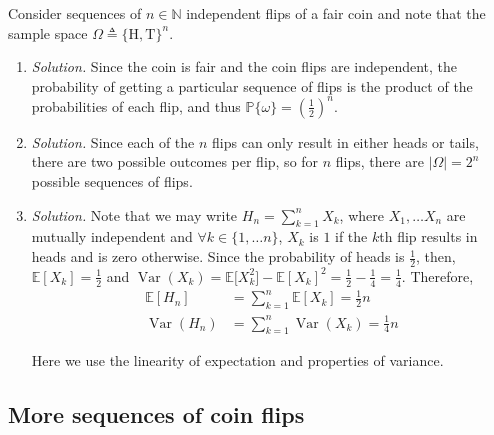 \documentclass{article}
\numberwithin{equation}{section}
\begin{document}
Consider sequences of $ n \in \mathbb{N} $ independent flips of a fair coin
and note that the sample space $ \Omega \triangleq \{\text{H}, \text{T}\}^n $.
\begin{enumerate}[label = \alph*.]
    \item
    \textit{Solution.} Since the coin is fair and the coin flips are
    independent, the probability of getting a particular sequence of flips is
    the product of the probabilities of each flip, and thus
    $ \mathbb{P}\{\omega\} = \left(\frac{1}{2}\right)^n $.

    \item
    \textit{Solution.} Since each of the $ n $ flips can only result in either
    heads or tails, there are two possible outcomes per flip, so for $ n $
    flips, there are $ |\Omega| = 2^n $ possible sequences of flips.

    \item
    \textit{Solution.} Note that we may write $ H_n = \sum_{k = 1}^nX_k $,
    where $ X_1, \ldots X_n $ are mutually independent and
    $ \forall k \in \{1, \ldots n\} $, $ X_k $ is $ 1 $ if the $ k $th flip
    results in heads and is zero otherwise. Since the probability of heads is
    $ \frac{1}{2} $, then, $ \mathbb{E}[X_k] = \frac{1}{2} $ and
    $ \operatorname{Var}(X_k) = \mathbb{E}\big[X_k^2\big] - \mathbb{E}[X_k]^2 = \frac{1}{2} - \frac{1}{4} = \frac{1}{4} $. Therefore,
    \begin{equation*}
        \begin{split}
        \mathbb{E}[H_n] & = \sum_{k = 1}^n\mathbb{E}[X_k] = \frac{1}{2}n \\
        \operatorname{Var}(H_n) & = \sum_{k = 1}^n\operatorname{Var}(X_k) =
            \frac{1}{4}n
        \end{split}
    \end{equation*}

    Here we use the linearity of expectation and properties of variance.
\end{enumerate}

\subsection{More sequences of coin flips}
\end{document}

